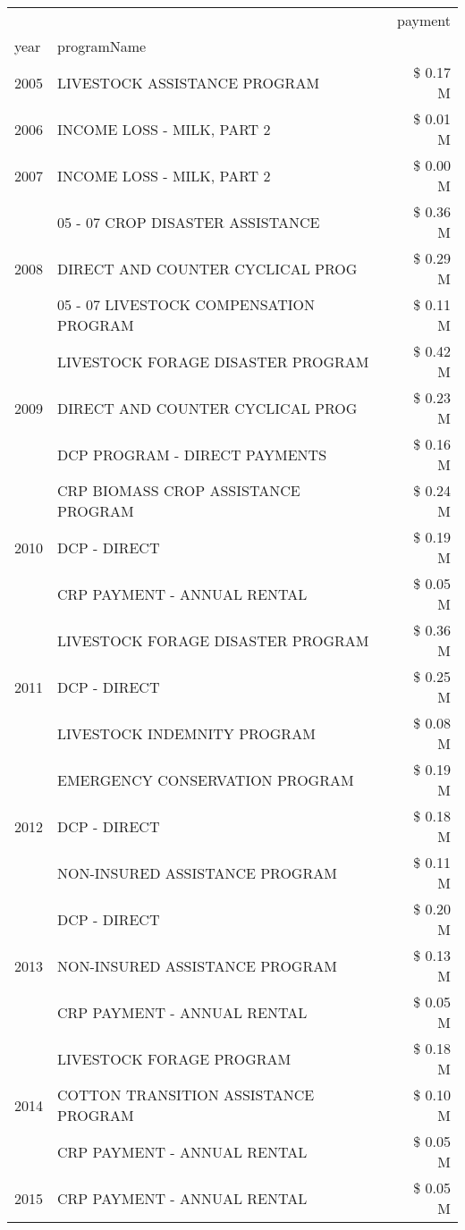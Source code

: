 \begin{tabular}{llr}
\toprule
 &  & payment \\
year & programName &  \\
\midrule
2005 & LIVESTOCK ASSISTANCE PROGRAM & \$ 0.17 M \\
\cline{1-3}
2006 & INCOME LOSS - MILK, PART 2 & \$ 0.01 M \\
\cline{1-3}
2007 & INCOME LOSS - MILK, PART 2 & \$ 0.00 M \\
\cline{1-3}
\multirow[t]{3}{*}{2008} & 05 - 07 CROP DISASTER ASSISTANCE & \$ 0.36 M \\
 & DIRECT AND COUNTER CYCLICAL PROG & \$ 0.29 M \\
 & 05 - 07 LIVESTOCK COMPENSATION PROGRAM & \$ 0.11 M \\
\cline{1-3}
\multirow[t]{3}{*}{2009} & LIVESTOCK FORAGE DISASTER  PROGRAM & \$ 0.42 M \\
 & DIRECT AND COUNTER CYCLICAL PROG & \$ 0.23 M \\
 & DCP PROGRAM - DIRECT PAYMENTS & \$ 0.16 M \\
\cline{1-3}
\multirow[t]{3}{*}{2010} & CRP BIOMASS CROP ASSISTANCE PROGRAM & \$ 0.24 M \\
 & DCP - DIRECT & \$ 0.19 M \\
 & CRP PAYMENT - ANNUAL RENTAL & \$ 0.05 M \\
\cline{1-3}
\multirow[t]{3}{*}{2011} & LIVESTOCK FORAGE DISASTER PROGRAM & \$ 0.36 M \\
 & DCP - DIRECT & \$ 0.25 M \\
 & LIVESTOCK INDEMNITY PROGRAM & \$ 0.08 M \\
\cline{1-3}
\multirow[t]{3}{*}{2012} & EMERGENCY CONSERVATION PROGRAM & \$ 0.19 M \\
 & DCP - DIRECT & \$ 0.18 M \\
 & NON-INSURED ASSISTANCE PROGRAM & \$ 0.11 M \\
\cline{1-3}
\multirow[t]{3}{*}{2013} & DCP - DIRECT & \$ 0.20 M \\
 & NON-INSURED ASSISTANCE PROGRAM & \$ 0.13 M \\
 & CRP PAYMENT - ANNUAL RENTAL & \$ 0.05 M \\
\cline{1-3}
\multirow[t]{3}{*}{2014} & LIVESTOCK FORAGE PROGRAM & \$ 0.18 M \\
 & COTTON TRANSITION ASSISTANCE PROGRAM & \$ 0.10 M \\
 & CRP PAYMENT - ANNUAL RENTAL & \$ 0.05 M \\
\cline{1-3}
\multirow[t]{3}{*}{2015} & CRP PAYMENT - ANNUAL RENTAL & \$ 0.05 M \\

\end{tabular}
